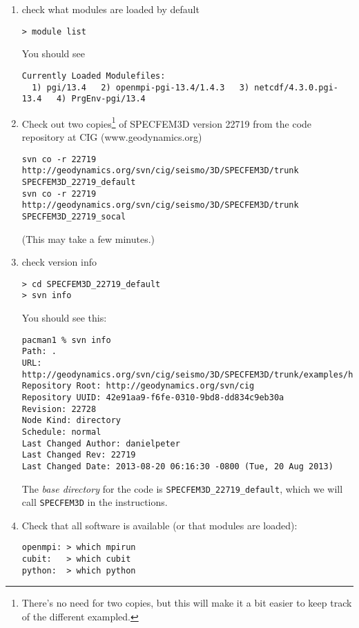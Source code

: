 \documentclass[10pt,titlepage,fleqn,letterpaper]{article}
\begin{document}
\begin{enumerate}
\item check what modules are loaded by default
\begin{verbatim}
> module list
\end{verbatim}

You should see
\begin{verbatim}
Currently Loaded Modulefiles:
  1) pgi/13.4   2) openmpi-pgi-13.4/1.4.3   3) netcdf/4.3.0.pgi-13.4   4) PrgEnv-pgi/13.4
\end{verbatim}

\item Check out two copies\footnote{There's no need for two copies, but this will make it a bit easier to keep track of the different exampled.} of SPECFEM3D version 22719 from the code repository at CIG (www.geodynamics.org)
%
\begin{verbatim}
svn co -r 22719 http://geodynamics.org/svn/cig/seismo/3D/SPECFEM3D/trunk SPECFEM3D_22719_default
svn co -r 22719 http://geodynamics.org/svn/cig/seismo/3D/SPECFEM3D/trunk SPECFEM3D_22719_socal
\end{verbatim}
%
(This may take a few minutes.)

\item check version info
%
\begin{verbatim}
> cd SPECFEM3D_22719_default
> svn info
\end{verbatim}

You should see this:
\begin{verbatim}
pacman1 % svn info
Path: .
URL: http://geodynamics.org/svn/cig/seismo/3D/SPECFEM3D/trunk/examples/homogeneous_halfspace_HEX8_elastic_absorbing_Stacey_5sides
Repository Root: http://geodynamics.org/svn/cig
Repository UUID: 42e91aa9-f6fe-0310-9bd8-dd834c9eb30a
Revision: 22728
Node Kind: directory
Schedule: normal
Last Changed Author: danielpeter
Last Changed Rev: 22719
Last Changed Date: 2013-08-20 06:16:30 -0800 (Tue, 20 Aug 2013)
\end{verbatim}

The {\em base directory} for the code is \verb+SPECFEM3D_22719_default+, which we will call \verb+SPECFEM3D+ in the instructions.

\item Check that all software is available (or that modules are loaded):
\begin{verbatim}
openmpi: > which mpirun
cubit:   > which cubit
python:  > which python
\end{verbatim}


\end{enumerate}
\end{document}
